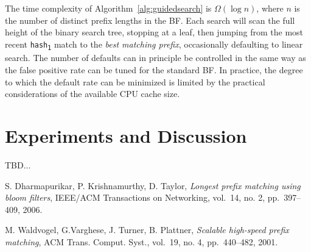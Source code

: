 \documentclass[conference,compsoc]{IEEEtran}
\begin{document}
The time
complexity of Algorithm~\ref{alg:guidedsearch} is $\Omega(\log n)$, 
where $n$ is the number of distinct prefix lengths in the BF. Each
search will scan the full height of the binary search tree, stopping at
a leaf, then jumping from the most recent \texttt{hash\textsubscript{1}} match
to the \emph{best matching prefix}, occasionally defaulting to linear
search. The number of defaults can in principle be controlled in the same
way as the false positive rate can be tuned for the standard BF.
In practice, the degree to which the default rate can be minimized is
limited by the practical considerations of the available CPU cache size.

\section{Experiments and Discussion}
TBD...

\begin{thebibliography}{9}


  S. Dharmapurikar, P. Krishnamurthy, D. Taylor,
  \emph{Longest prefix matching using bloom filters},
  IEEE/ACM Transactions on Networking,
  vol.~14, no. 2, pp.~397--409,
  2006.

  M. Waldvogel, G.Varghese, J. Turner, B. Plattner,
  \emph{Scalable high-speed prefix matching},
  ACM Trans. Comput. Syst.,
  vol.~19, no. 4, pp.~440--482,
  2001.



\end{thebibliography}

\end{document}

